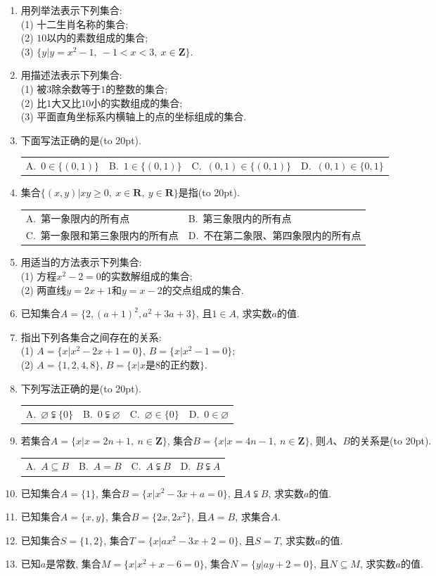 \documentclass[10pt,a4paper]{article}
\newcommand{\bracket}[1]{(\hbox to #1pt{})}
\newcommand{\twoch}[4]{\par\begin{tabular}{p{.46\textwidth}p{.46\textwidth}}
A.~#1& B.~#2\\
C.~#3& D.~#4
\end{tabular}}
\newcommand{\fourch}[4]{\par\begin{tabular}{p{.23\textwidth}p{.23\textwidth}p{.23\textwidth}p{.23\textwidth}}
A.~#1 &B.~#2& C.~#3& D.~#4
\end{tabular}}
\begin{document}
\begin{enumerate}[1.]

\item 用列举法表示下列集合:\\
(1) 十二生肖名称的集合;\\
(2) $10$以内的素数组成的集合;\\
(3) $\{y|y=x^2-1, \ -1<x<3, \ x\in \mathbf{Z}\}$.
\item 用描述法表示下列集合:\\
(1) 被$3$除余数等于$1$的整数的集合;\\
(2) 比$1$大又比$10$小的实数组成的集合;\\
(3) 平面直角坐标系内横轴上的点的坐标组成的集合.
\item 下面写法正确的是\bracket{20}.
\fourch{$0\in \{(0,1)\}$}{$1\in \{(0,1)\}$}{$(0,1)\in \{(0,1)\}$}{$(0,1)\in \{0,1\}$}
\item 集合$\{(x,y)|xy\ge 0, \ x\in \mathbf{R}, \ y\in \mathbf{R}\}$是指\bracket{20}.
\twoch{第一象限内的所有点}{第三象限内的所有点}{第一象限和第三象限内的所有点}{不在第二象限、第四象限内的所有点}
\item 用适当的方法表示下列集合:\\
(1) 方程$x^2-2=0$的实数解组成的集合;\\
(2) 两直线$y=2x+1$和$y=x-2$的交点组成的集合.
\item 已知集合$A=\{2,(a+1)^2,a^2+3a+3\}$, 且$1\in A$, 求实数$a$的值.
\item 指出下列各集合之间存在的关系:\\
(1) $A=\{x|x^2-2x+1=0\}$, $B=\{x|x^2-1=0\}$;\\
(2) $A=\{1,2,4,8\}$, $B=\{x|x\text{是}8\text{的正约数}\}$.
\item 下列写法正确的是\bracket{20}.
\fourch{$\varnothing \subsetneqq \{0\}$}{$0\subsetneqq \varnothing$}{$\varnothing \in \{0\}$}{$0\in \varnothing$}
\item 若集合$A=\{x|x=2n+1, \ n\in \mathbf{Z}\}$, 集合$B=\{x|x=4n-1, \ n\in \mathbf{Z}\}$, 则$A$、$B$的关系是\bracket{20}.
\fourch{$A\subseteq B$}{$A=B$}{$A\subsetneqq B$}{$B\subsetneqq A$}
\item 已知集合$A=\{1\}$, 集合$B=\{x|x^2-3x+a=0\}$, 且$A\subsetneqq B$, 求实数$a$的值.
\item 已知集合$A=\{x,y\}$, 集合$B=\{2x,2x^2\}$, 且$A=B$, 求集合$A$.
\item 已知集合$S=\{1,2\}$, 集合$T=\{x|ax^2-3x+2=0\}$, 且$S=T$, 求实数$a$的值.
\item 已知$a$是常数, 集合$M=\{x|x^2+x-6=0\}$, 集合$N=\{y|ay+2=0\}$, 且$N\subseteq M$, 求实数$a$的值.

\end{enumerate}
\end{document}
